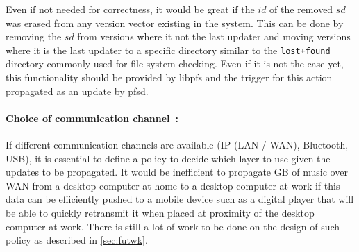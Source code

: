 Even if not needed for correctness, it would be great if the $id$ of
the removed $sd$ was erased from any version vector existing in the
system. This can be done by removing the $sd$ from versions where it
not the last updater and moving versions where it is the last updater
to a specific directory similar to the {\tt lost+found} directory
commonly used for file system checking. Even if it is not the case
yet, this functionality should be provided by libpfs and the trigger
for this action propagated as an update by pfsd.

\paragraph {Choice of communication channel~:}
If different communication channels are available (IP (LAN / WAN),
Bluetooth, USB), it is essential to define a policy to decide which
layer to use given the updates to be propagated. It would be
inefficient to propagate GB of music over WAN from a desktop computer
at home to a desktop computer at work if this data can be efficiently
pushed to a mobile device such as a digital player that will be able
to quickly retransmit it when placed at proximity of the desktop
computer at work. There is still a lot of work to be done on the
design of such policy as described in \ref{sec:futwk}.



